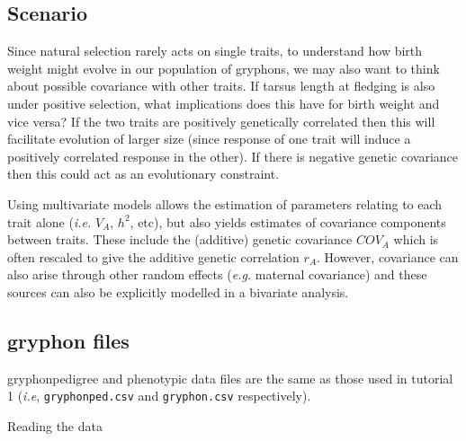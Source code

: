 \documentclass[
  12pt,
]{book}
\newenvironment{Shaded}{\begin{snugshade}}{\end{snugshade}}
\newcommand{\FunctionTok}[1]{\textcolor[rgb]{0.00,0.00,0.00}{#1}}
\newcommand{\NormalTok}[1]{#1}
\newcommand{\OtherTok}[1]{\textcolor[rgb]{0.56,0.35,0.01}{#1}}
\newcommand{\SpecialCharTok}[1]{\textcolor[rgb]{0.00,0.00,0.00}{#1}}
\newcommand{\StringTok}[1]{\textcolor[rgb]{0.31,0.60,0.02}{#1}}
\begin{document}
\hypertarget{scenario-1}{%
\subsection{Scenario}\label{scenario-1}}

Since natural selection rarely acts on single traits, to understand how birth weight might evolve in our population of gryphons, we may also want to think about possible covariance with other traits. If tarsus length at fledging is also under positive selection, what implications does this have for birth weight and vice versa? If the two traits are positively genetically correlated then this will facilitate evolution of larger size (since response of one trait will induce a positively correlated response in the other). If there is negative genetic covariance then this could act as an evolutionary constraint.

Using multivariate models allows the estimation of parameters relating to each trait alone (\emph{i.e.} \(V_A\), \(h^2\), etc), but also yields estimates of covariance components between traits. These include the (additive) genetic covariance \(COV_A\) which is often rescaled to give the additive genetic correlation \(r_A\). However, covariance can also arise through other random effects (\emph{e.g.} maternal covariance) and these sources can also be explicitly modelled in a bivariate analysis.

\hypertarget{gryphon-files}{%
\subsection{gryphon files}\label{gryphon-files}}

gryphonpedigree and phenotypic data files are the same as those used in tutorial 1 (\emph{i.e}, \texttt{gryphonped.csv} and \texttt{gryphon.csv} respectively).

Reading the data

\begin{Shaded}
\end{Shaded}
\end{document}
